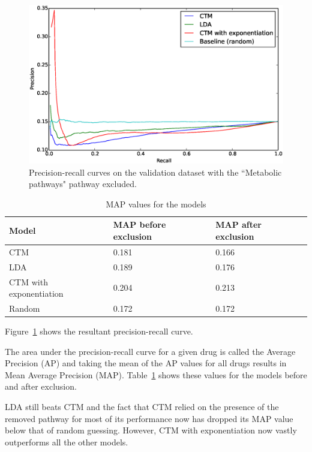 \documentclass[12pt,a4paper,twoside,openright]{report}
\begin{document}
\begin{figure}[!htb]
\includegraphics[width=\textwidth]{ctd-pr-curves-no1100.eps}
\caption{Precision-recall curves on the validation dataset with the ``Metabolic pathways" pathway excluded.}
\label{fig:ctd-pr-curves-no1100}
\end{figure}


\begin{table}
	\centering
	\begin{tabular}{| l | l | l |}
		\hline
		Model & MAP before exclusion & MAP after exclusion \\
		\hline
		CTM & 0.181 & 0.166 \\
		LDA & 0.189 & 0.176 \\
		CTM with exponentiation & 0.204 & 0.213 \\
		Random & 0.172 & 0.172 \\
		\hline
	\end{tabular}
	\caption{MAP values for the models}
	\label{tab:ctd-map}
\end{table}

Figure~\ref{fig:ctd-pr-curves-no1100} shows the resultant precision-recall curve. 

The area under the precision-recall curve for a given drug is called the Average Precision (AP) and taking the mean of the AP values for all drugs results in Mean Average Precision (MAP). Table~\ref{tab:ctd-map} shows these values for the models before and after exclusion.

LDA still beats CTM and the fact that CTM relied on the presence of the removed pathway for most of its performance now has dropped its MAP value below that of random guessing. However, CTM with exponentiation now vastly outperforms all the other models.
\end{document}
